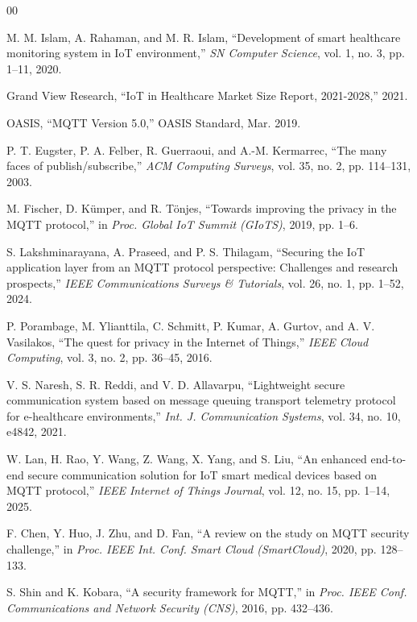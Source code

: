 \documentclass[conference]{IEEEtran}
\begin{document}
\begin{thebibliography}{00}

M. M. Islam, A. Rahaman, and M. R. Islam, ``Development of smart healthcare monitoring system in IoT environment,'' \textit{SN Computer Science}, vol. 1, no. 3, pp. 1--11, 2020.

Grand View Research, ``IoT in Healthcare Market Size Report, 2021-2028,'' 2021.

OASIS, ``MQTT Version 5.0,'' OASIS Standard, Mar. 2019.

P. T. Eugster, P. A. Felber, R. Guerraoui, and A.-M. Kermarrec, ``The many faces of publish/subscribe,'' \textit{ACM Computing Surveys}, vol. 35, no. 2, pp. 114--131, 2003.

M. Fischer, D. K\"{u}mper, and R. T\"{o}njes, ``Towards improving the privacy in the MQTT protocol,'' in \textit{Proc. Global IoT Summit (GIoTS)}, 2019, pp. 1--6.

S. Lakshminarayana, A. Praseed, and P. S. Thilagam, ``Securing the IoT application layer from an MQTT protocol perspective: Challenges and research prospects,'' \textit{IEEE Communications Surveys \& Tutorials}, vol. 26, no. 1, pp. 1--52, 2024.

P. Porambage, M. Ylianttila, C. Schmitt, P. Kumar, A. Gurtov, and A. V. Vasilakos, ``The quest for privacy in the Internet of Things,'' \textit{IEEE Cloud Computing}, vol. 3, no. 2, pp. 36--45, 2016.

V. S. Naresh, S. R. Reddi, and V. D. Allavarpu, ``Lightweight secure communication system based on message queuing transport telemetry protocol for e-healthcare environments,'' \textit{Int. J. Communication Systems}, vol. 34, no. 10, e4842, 2021.

W. Lan, H. Rao, Y. Wang, Z. Wang, X. Yang, and S. Liu, ``An enhanced end-to-end secure communication solution for IoT smart medical devices based on MQTT protocol,'' \textit{IEEE Internet of Things Journal}, vol. 12, no. 15, pp. 1--14, 2025.

F. Chen, Y. Huo, J. Zhu, and D. Fan, ``A review on the study on MQTT security challenge,'' in \textit{Proc. IEEE Int. Conf. Smart Cloud (SmartCloud)}, 2020, pp. 128--133.

S. Shin and K. Kobara, ``A security framework for MQTT,'' in \textit{Proc. IEEE Conf. Communications and Network Security (CNS)}, 2016, pp. 432--436.


\end{thebibliography}
\end{document}
